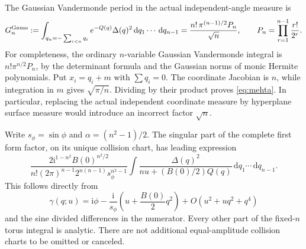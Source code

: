 \documentclass[11pt]{article}
\numberwithin{equation}{section}
\theoremstyle{definition}
\newcommand{\dd}{\,\mathrm d}
\newcommand{\ii}{\mathrm i}
\begin{document}
The Gaussian Vandermonde period in the actual independent-angle measure
is
\begin{equation}\label{eq:mehta}
 G_n^{\rm Gauss}:=
 \int_{q_n=-\sum_{i<n}q_i}e^{-Q(q)}\Delta(q)^2
                         \dd q_1\cdots\dd q_{n-1}
 =\frac{n!\,\pi^{(n-1)/2}P_n}{\sqrt n},\qquad
 P_n=\prod_{r=1}^{n-1}\frac{r!}{2^r}.
\end{equation}
For completeness, the ordinary $n$-variable Gaussian Vandermonde
integral is $n!\pi^{n/2}P_n$, by the determinant formula and the
Gaussian norms of monic Hermite polynomials. Put $x_i=q_i+m$ with
$\sum q_i=0$. The coordinate Jacobian is $n$, while integration in
$m$ gives $\sqrt{\pi/n}$. Dividing by their product proves
\eqref{eq:mehta}. In particular, replacing the actual independent
coordinate measure by hyperplane surface measure would introduce an
incorrect factor $\sqrt n$.

Write $s_\phi=\sin\phi$ and $\alpha=(n^2-1)/2$. The singular part
of the complete first form factor, on its unique collision chart, has
leading expression
\begin{equation}\label{eq:leadingintegral}
 \frac{2\ii^{1-n^2}B(0)^{n^2/2}}
 {n!(2\pi)^{n-1}2^{n(n-1)}s_\phi^{n^2-1}}
 \int\frac{\Delta(q)^2}{nu+(B(0)/2)Q(q)}
                                   \dd q_1\cdots\dd q_{n-1}.
\end{equation}
This follows directly from
\[
 \gamma(q;u)=\ii\phi-\frac{\ii}{s_\phi}
                  \left(u+\frac{B(0)}2q^2\right)
                  +O(u^2+u q^2+q^4)
\]
and the sine divided differences in the numerator. Every other part of
the fixed-$n$ torus integral is analytic. There are not additional
equal-amplitude collision charts to be omitted or canceled.
\end{document}
